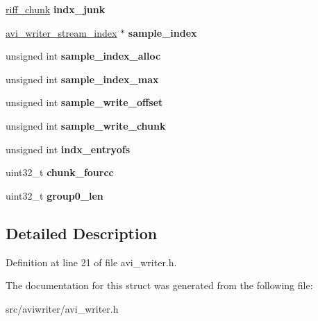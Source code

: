 \begin{DoxyCompactItemize}
\item 
\hypertarget{structavi__writer__stream_adc1650f5039e6d87ef33f84d57739ce9}{\hyperlink{structriff__chunk}{riff\-\_\-chunk} {\bfseries indx\-\_\-junk}}\label{structavi__writer__stream_adc1650f5039e6d87ef33f84d57739ce9}

\item 
\hypertarget{structavi__writer__stream_a18738c93a85edc6497654199fc81997e}{\hyperlink{structavi__writer__stream__index}{avi\-\_\-writer\-\_\-stream\-\_\-index} $\ast$ {\bfseries sample\-\_\-index}}\label{structavi__writer__stream_a18738c93a85edc6497654199fc81997e}

\item 
\hypertarget{structavi__writer__stream_a5672a6f4945d3e0545dafaaf3ba1d3f7}{unsigned int {\bfseries sample\-\_\-index\-\_\-alloc}}\label{structavi__writer__stream_a5672a6f4945d3e0545dafaaf3ba1d3f7}

\item 
\hypertarget{structavi__writer__stream_a2f2db114c19282db775e8177c4fa673c}{unsigned int {\bfseries sample\-\_\-index\-\_\-max}}\label{structavi__writer__stream_a2f2db114c19282db775e8177c4fa673c}

\item 
\hypertarget{structavi__writer__stream_a37a1288dab4d9920d6c0962d67dfbdb8}{unsigned int {\bfseries sample\-\_\-write\-\_\-offset}}\label{structavi__writer__stream_a37a1288dab4d9920d6c0962d67dfbdb8}

\item 
\hypertarget{structavi__writer__stream_a0cafa8bf0bf8e256f9dd32987f6725f6}{unsigned int {\bfseries sample\-\_\-write\-\_\-chunk}}\label{structavi__writer__stream_a0cafa8bf0bf8e256f9dd32987f6725f6}

\item 
\hypertarget{structavi__writer__stream_af7a35387b24037cb6eccb73acb09e314}{unsigned int {\bfseries indx\-\_\-entryofs}}\label{structavi__writer__stream_af7a35387b24037cb6eccb73acb09e314}

\item 
\hypertarget{structavi__writer__stream_a64edeb191346191c6c068b5be816644c}{uint32\-\_\-t {\bfseries chunk\-\_\-fourcc}}\label{structavi__writer__stream_a64edeb191346191c6c068b5be816644c}

\item 
\hypertarget{structavi__writer__stream_aff1250ebfae2dfd37438753fe460b1ca}{uint32\-\_\-t {\bfseries group0\-\_\-len}}\label{structavi__writer__stream_aff1250ebfae2dfd37438753fe460b1ca}

\end{DoxyCompactItemize}


\subsection{Detailed Description}


Definition at line 21 of file avi\-\_\-writer.\-h.



The documentation for this struct was generated from the following file\-:\begin{DoxyCompactItemize}
\item 
src/aviwriter/avi\-\_\-writer.\-h\end{DoxyCompactItemize}
